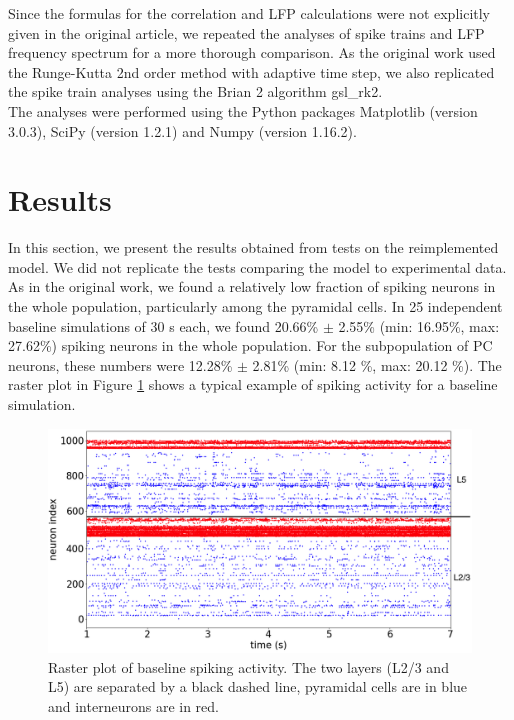 Since the formulas for the correlation and LFP calculations were not explicitly given in the original article, we repeated the analyses of spike trains and LFP frequency spectrum for a more thorough comparison. As the original work used the Runge-Kutta 2nd order method with adaptive time step, we also replicated the spike train analyses using the Brian 2 algorithm gsl\_rk2.\\

The analyses were performed using the Python packages Matplotlib (version 3.0.3), SciPy (version 1.2.1) and Numpy (version 1.16.2).\\

\section*{Results}

In this section, we present the results obtained from tests on the reimplemented model. We did not replicate the tests comparing the model to experimental data.\\

As in the original work, we found a relatively low fraction of spiking neurons in the whole population, particularly among the pyramidal cells. In 25 independent baseline simulations of 30 s each, we found 20.66\% $\pm$ 2.55\% (min: 16.95\%, max: 27.62\%) spiking neurons in the whole population. For the subpopulation of PC neurons, these numbers were 12.28\% $\pm$ 2.81\% (min: 8.12 \%, max: 20.12 \%). The raster plot in Figure \ref{fig:mainraster} shows a typical example of spiking activity for a baseline simulation.  \\

\begin{figure}[H]
    
    \includegraphics[scale=0.30]{mainrasterplota2.png}
    \caption{Raster plot of baseline spiking activity. The two layers (L2/3 and L5) are separated by a black dashed line, pyramidal cells are in blue and interneurons are in red.}
    \label{fig:mainraster}
\end{figure}

